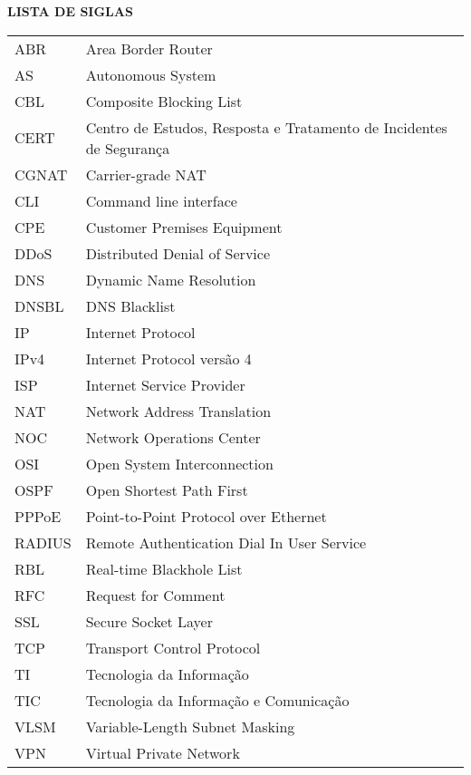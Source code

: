 \begin{center}
  \normalsize{\textbf{LISTA DE SIGLAS}}
\end{center}

\vspace{1mm}

\begin{center}
  \begin{tabular}{ m{3cm} m{10cm} }
    ABR & Area Border Router \\
    AS & Autonomous System \\
    CBL & Composite Blocking List \\
    CERT &  Centro de Estudos, Resposta e Tratamento de Incidentes de Segurança \\
    CGNAT & Carrier-grade NAT \\
    CLI & Command line interface \\
    CPE & Customer Premises Equipment \\
    DDoS & Distributed Denial of Service \\
    DNS & Dynamic Name Resolution \\
    DNSBL & DNS Blacklist \\
    IP & Internet Protocol \\ 
    IPv4 & Internet Protocol versão 4 \\ 
    ISP & Internet Service Provider \\ 
    NAT & Network Address Translation \\
    NOC & Network Operations Center \\ 
    OSI & Open System Interconnection \\
    OSPF & Open Shortest Path First \\
    PPPoE & Point-to-Point Protocol over Ethernet \\
    RADIUS & Remote Authentication Dial In User Service \\
    RBL & Real-time Blackhole List \\
    RFC & Request for Comment \\
    SSL & Secure Socket Layer \\
    TCP & Transport Control Protocol \\ 
    TI & Tecnologia da Informação \\ 
    TIC & Tecnologia da Informação e Comunicação \\ 
    VLSM & Variable-Length Subnet Masking \\ 
    VPN & Virtual Private Network \\ 
  \end{tabular}
\end{center}
